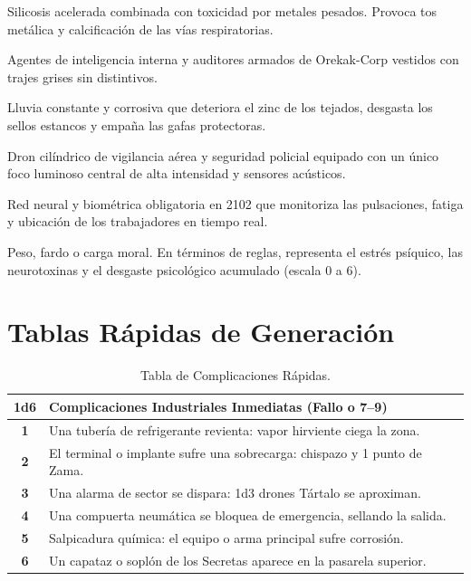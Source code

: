 \begin{description}[leftmargin=1.8em, itemsep=4pt]
    \item[\lead{Plaga Gris (Izurrite Grisa):}] Silicosis acelerada combinada con toxicidad por metales pesados. Provoca tos metálica y calcificación de las vías respiratorias.
    \item[\lead{Secretas (Sekretak):}] Agentes de inteligencia interna y auditores armados de Orekak-Corp vestidos con trajes grises sin distintivos.
    \item[\lead{Sirimiri Ácido:}] Lluvia constante y corrosiva que deteriora el zinc de los tejados, desgasta los sellos estancos y empaña las gafas protectoras.
    \item[\lead{Tártalo:}] Dron cilíndrico de vigilancia aérea y seguridad policial equipado con un único foco luminoso central de alta intensidad y sensores acústicos.
    \item[\lead{Velo (Estalkia):}] Red neural y biométrica obligatoria en 2102 que monitoriza las pulsaciones, fatiga y ubicación de los trabajadores en tiempo real.
    \item[\lead{Zama:}] Peso, fardo o carga moral. En términos de reglas, representa el estrés psíquico, las neurotoxinas y el desgaste psicológico acumulado (escala 0 a 6).
\end{description}

\newpage

\section{Tablas Rápidas de Generación}

\begin{table}[htbp]
\centering
\small
\begin{tabularx}{\textwidth}{c X}
\toprule
\textbf{1d6} & \textbf{Complicaciones Industriales Inmediatas (Fallo o 7--9)} \\
\midrule
\textbf{1} & Una tubería de refrigerante revienta: vapor hirviente ciega la zona. \\
\textbf{2} & El terminal o implante sufre una sobrecarga: chispazo y 1 punto de Zama. \\
\textbf{3} & Una alarma de sector se dispara: 1d3 drones Tártalo se aproximan. \\
\textbf{4} & Una compuerta neumática se bloquea de emergencia, sellando la salida. \\
\textbf{5} & Salpicadura química: el equipo o arma principal sufre corrosión. \\
\textbf{6} & Un capataz o soplón de los Secretas aparece en la pasarela superior. \\
\bottomrule
\end{tabularx}
\caption{Tabla de Complicaciones Rápidas.}
\end{table}

